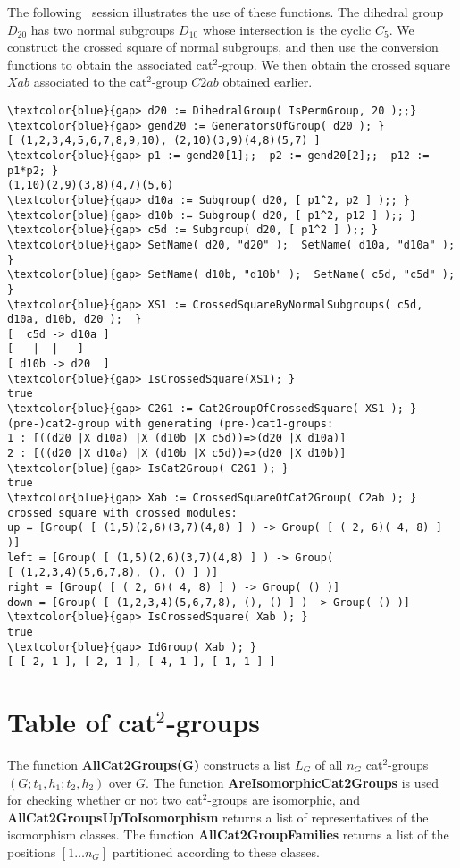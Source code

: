 \documentclass[a4paper,11pt]{article}
\theoremstyle{plain}
\theoremstyle{definition}
\begin{document}
The following \GAP\ session illustrates the use of these functions.
The dihedral group $D_{20}$ has two normal subgroups $D_{10}$ 
whose intersection is the cyclic $C_5$.  
We construct the crossed square of normal subgroups, 
and then use the conversion functions to obtain the associated cat$^{2}$-group. 
We then obtain the crossed square $Xab$ associated to the cat$^2$-group $C2ab$ 
obtained earlier. 

\begin{Verbatim}[frame=single, fontsize=\small, commandchars=\\\{\}]
\textcolor{blue}{gap> d20 := DihedralGroup( IsPermGroup, 20 );;}
\textcolor{blue}{gap> gend20 := GeneratorsOfGroup( d20 ); }
[ (1,2,3,4,5,6,7,8,9,10), (2,10)(3,9)(4,8)(5,7) ]
\textcolor{blue}{gap> p1 := gend20[1];;  p2 := gend20[2];;  p12 := p1*p2; }
(1,10)(2,9)(3,8)(4,7)(5,6)
\textcolor{blue}{gap> d10a := Subgroup( d20, [ p1^2, p2 ] );; }
\textcolor{blue}{gap> d10b := Subgroup( d20, [ p1^2, p12 ] );; }
\textcolor{blue}{gap> c5d := Subgroup( d20, [ p1^2 ] );; }
\textcolor{blue}{gap> SetName( d20, "d20" );  SetName( d10a, "d10a" ); }
\textcolor{blue}{gap> SetName( d10b, "d10b" );  SetName( c5d, "c5d" );  }
\textcolor{blue}{gap> XS1 := CrossedSquareByNormalSubgroups( c5d, d10a, d10b, d20 );  }
[  c5d -> d10a ]
[   |  |   ]
[ d10b -> d20  ]
\textcolor{blue}{gap> IsCrossedSquare(XS1); }
true
\textcolor{blue}{gap> C2G1 := Cat2GroupOfCrossedSquare( XS1 ); }
(pre-)cat2-group with generating (pre-)cat1-groups:
1 : [((d20 |X d10a) |X (d10b |X c5d))=>(d20 |X d10a)]
2 : [((d20 |X d10a) |X (d10b |X c5d))=>(d20 |X d10b)]
\textcolor{blue}{gap> IsCat2Group( C2G1 ); }
true
\textcolor{blue}{gap> Xab := CrossedSquareOfCat2Group( C2ab ); }
crossed square with crossed modules:
up = [Group( [ (1,5)(2,6)(3,7)(4,8) ] ) -> Group( [ ( 2, 6)( 4, 8) ] )]
left = [Group( [ (1,5)(2,6)(3,7)(4,8) ] ) -> Group(
[ (1,2,3,4)(5,6,7,8), (), () ] )]
right = [Group( [ ( 2, 6)( 4, 8) ] ) -> Group( () )]
down = [Group( [ (1,2,3,4)(5,6,7,8), (), () ] ) -> Group( () )]
\textcolor{blue}{gap> IsCrossedSquare( Xab ); }
true
\textcolor{blue}{gap> IdGroup( Xab ); }
[ [ 2, 1 ], [ 2, 1 ], [ 4, 1 ], [ 1, 1 ] ]
\end{Verbatim}


\section{Table of cat$^{2}$-groups}

The function \textbf{AllCat2Groups(G)} constructs a list $L_G$ 
of all $n_G$ cat$^{2}$-groups $(G;t_1,h_1;t_2,h_2)$ over $G$. 
The function \textbf{AreIsomorphicCat2Groups} is used for checking whether 
or not two cat$^{2}$-groups are isomorphic, 
and \textbf{AllCat2GroupsUpToIsomorphism} returns a list of representatives 
of the isomorphism classes. 
The function \textbf{AllCat2GroupFamilies} returns a list of the positions 
$[1 \ldots n_G]$ partitioned according to these classes. 
\end{document}
